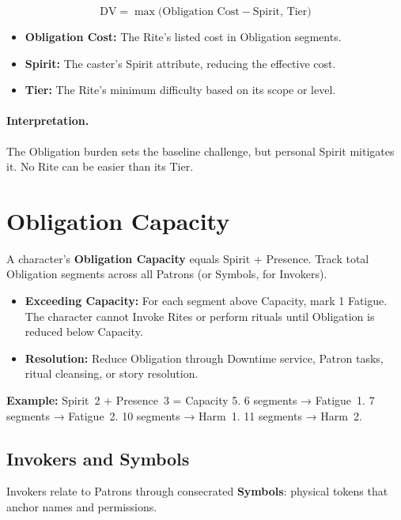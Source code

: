 \[
\text{DV} = \max\!\big(\text{Obligation Cost} - \text{Spirit}, \, \text{Tier}\big)
\]

\begin{itemize}
  \item \textbf{Obligation Cost:} The Rite’s listed cost in Obligation segments.
  \item \textbf{Spirit:} The caster’s Spirit attribute, reducing the effective cost.
  \item \textbf{Tier:} The Rite’s minimum difficulty based on its scope or level.
\end{itemize}

\paragraph{Interpretation.} The Obligation burden sets the baseline challenge, but personal Spirit mitigates it. No Rite can be easier than its Tier.

\section{Obligation Capacity}

A character’s \textbf{Obligation Capacity} equals Spirit + Presence.  
Track total Obligation segments across all Patrons (or Symbols, for Invokers).

\begin{itemize}
  \item \textbf{Exceeding Capacity:} For each segment above Capacity, mark 1 Fatigue. The character cannot Invoke Rites or perform rituals until Obligation is reduced below Capacity.
  \item \textbf{Resolution:} Reduce Obligation through Downtime service, Patron tasks, ritual cleansing, or story resolution.
\end{itemize}

\textbf{Example:} Spirit~2 + Presence~3 = Capacity 5.  
6 segments → Fatigue~1.  
7 segments → Fatigue~2.  
10 segments → Harm~1.  
11 segments → Harm~2.


\subsection{Invokers and Symbols}
\label{subsec:invokers}
Invokers relate to Patrons through consecrated \textbf{Symbols}: physical tokens that anchor names and permissions.


